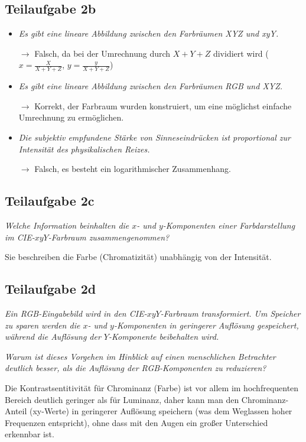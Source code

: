 \documentclass[a4paper]{scrartcl}
\begin{document}
\subsection*{Teilaufgabe 2b}
\begin{itemize}
    \item \textit{Es gibt eine lineare Abbildung zwischen den Farbräumen XYZ und xyY.}
    \item[$\rightarrow$] Falsch, da bei der Umrechnung durch $X + Y + Z$ dividiert wird ($x = \frac{X}{X+Y+Z}$, $y = \frac{y}{X+Y+Z}$)
    \item \textit{Es gibt eine lineare Abbildung zwischen den Farbräumen RGB und XYZ.}
    \item[$\rightarrow$] Korrekt, der Farbraum wurden konstruiert, um eine möglichst einfache Umrechnung zu ermöglichen.
    \item \textit{Die subjektiv empfundene Stärke von Sinneseindrücken ist proportional zur Intensität des physikalischen Reizes.}
    \item[$\rightarrow$] Falsch, es besteht ein logarithmischer Zusammenhang.
\end{itemize}

\subsection*{Teilaufgabe 2c}
\textit{Welche Information beinhalten die $x$- und $y$-Komponenten einer Farbdarstellung im CIE-$xyY$-Farbraum zusammengenommen?}

Sie beschreiben die Farbe (Chromatizität) unabhängig von der Intensität.

\subsection*{Teilaufgabe 2d}
\textit{Ein RGB-Eingabebild wird in den CIE-$xyY$-Farbraum transformiert. Um Speicher zu
sparen werden die $x$- und $y$-Komponenten in geringerer Auflösung gespeichert, während
die Auflösung der $Y$-Komponente beibehalten wird.}

\textit{Warum ist dieses Vorgehen im Hinblick auf einen menschlichen Betrachter deutlich
besser, als die Auflösung der RGB-Komponenten zu reduzieren?}

Die Kontrastsentitivität für Chrominanz (Farbe) ist vor allem im hochfrequenten Bereich deutlich geringer als für Luminanz, daher kann man den Chrominanz-Anteil (xy-Werte) in geringerer Auflösung speichern (was dem Weglassen hoher Frequenzen entspricht), ohne dass mit den Augen ein großer Unterschied erkennbar ist.
\end{document}
